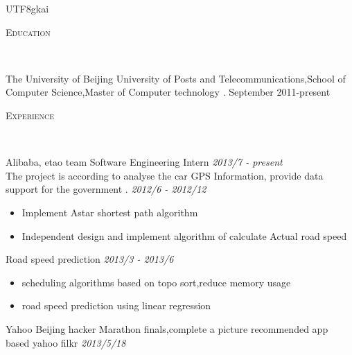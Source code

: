 \documentclass[9pt]{article}
\newenvironment{changemargin}[2]{%
  \begin{list}{}{%
    \setlength{\topsep}{0pt}%
    \setlength{\leftmargin}{#1}%
    \setlength{\rightmargin}{#2}%
    \setlength{\listparindent}{\parindent}%
    \setlength{\itemindent}{\parindent}%
    \setlength{\parsep}{\parskip}%
  }%
  \item[]}{\end{list}
}
\newcommand{\lineover}{
	\begin{changemargin}{-0.05in}{-0.05in}
		\vspace*{-8pt}
		\hrulefill \\
		\vspace*{-2pt}
	\end{changemargin}
}
\newcommand{\header}[1]{
	\begin{changemargin}{-0.5in}{-0.5in}
		\scshape{#1}\\
  	\lineover
	\end{changemargin}
}
\newenvironment{body} {
	\vspace*{-16pt}
	\begin{changemargin}{-0.25in}{-0.5in}
  }	
	{\end{changemargin}
}
\begin{document}
\begin{CJK}{UTF8}{gkai}
\begin{body}
\end{body}

\smallskip


\header{Education}

\begin{body}
	\vspace{14pt}
	{The University of Beijing University of Posts and Telecommunications,School of Computer Science,Master of Computer technology .} \hfill  September 2011-present{} \\
\end{body}

\smallskip

\header{Experience}

\begin{body}
	\vspace{14pt}
    	{Alibaba, etao team    Software Engineering Intern }\hfill  \emph{2013/7 - present }\\

	{The project is according to analyse the car GPS Information, provide data support for the government .} \hfill  \emph{ 2012/6 -  2012/12}\\
	\vspace*{-4pt}
	\begin{itemize} \itemsep -0pt  %
		\item Implement Astar shortest path algorithm
		\item Independent design and implement algorithm of calculate Actual road speed
	\end{itemize}

	{Road speed prediction } \hfill  \emph{ 2013/3 -  2013/6}\\
	\vspace*{-4pt}
	\begin{itemize} \itemsep -0pt  %
		\item scheduling algorithms based on topo sort,reduce memory usage 
		\item road speed prediction using  linear regression 
	\end{itemize}
	{ Yahoo Beijing hacker Marathon finals,complete a picture recommended app based yahoo filkr } \hfill \emph{2013/5/18 }\\



\end{body}
\end{CJK}
\end{document}
